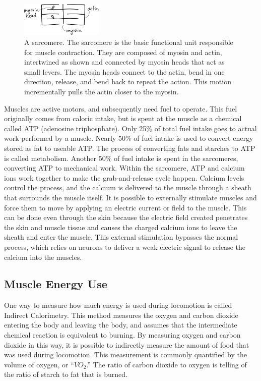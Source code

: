 \begin{figure}[htb]		%
\begin{centering}
\includegraphics[width=0.35\textwidth]{Figures/Sarcomere}\par
\end{centering}
\caption[Diagram: A Sarcomere]{A sarcomere. The sarcomere is the basic functional unit responsible for muscle contraction. They are composed of myosin and actin, intertwined as shown and connected by myosin heads that act as small levers. The myosin heads connect to the actin, bend in one direction, release, and bend back to repeat the action. This motion incrementally pulls the actin closer to the myosin.}
\label{fig:Sarcomere}
\end{figure}
%

Muscles are active motors, and subsequently need fuel to operate. This fuel originally comes from caloric intake, but is spent at the muscle as a chemical called ATP (adenosine triphosphate). Only 25\% of total fuel intake goes to actual work performed by a muscle. Nearly 50\% of fuel intake is used to convert energy stored as fat to useable ATP. The process of converting fats and starches to ATP is called metabolism. Another 50\% of fuel intake is spent in the sarcomeres, converting ATP to mechanical work. Within the sarcomere, ATP and calcium ions work together to make the grab-and-release cycle happen. Calcium levels control the process, and the calcium is delivered to the muscle through a sheath that surrounds the muscle itself. It is possible to externally stimulate muscles and force them to move by applying an electric current or field to the muscle. This can be done even through the skin because the electric field created penetrates the skin and muscle tissue and causes the charged calcium ions to leave the sheath and enter the muscle. This external stimulation bypasses the normal process, which relies on neurons to deliver a weak electric signal to release the calcium into the muscles. 


\subsection{Muscle Energy Use}

One way to measure how much energy is used during locomotion is called Indirect Calorimetry. This method measures the oxygen and carbon dioxide entering the body and leaving the body, and assumes that the intermediate chemical reaction is equivalent to burning. By measuring oxygen and carbon dioxide in this way, it is possible to indirectly measure the amount of food that was used during locomotion. This measurement is commonly quantified by the volume of oxygen, or ``$VO_2$.'' The ratio of carbon dioxide to oxygen is telling of the ratio of starch to fat that is burned.

